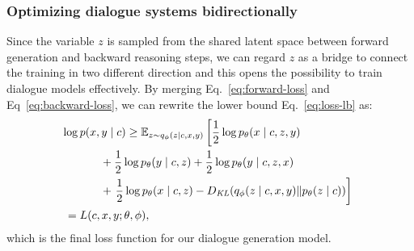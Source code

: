 \documentclass[sigconf]{acmart}
\begin{document}
\subsubsection{Optimizing dialogue systems bidirectionally} Since the variable $z$ is sampled from the shared latent space between forward generation and backward reasoning steps, we can regard $z$ as a bridge to connect the training in two different direction and this opens the possibility to train dialogue models effectively. By merging Eq.~\ref{eq:forward-loss} and Eq~\ref{eq:backward-loss}, we can rewrite the lower bound Eq.~\ref{eq:loss-lb} as:
%
\begin{equation}
\begin{split}
\mbox{}\hspace*{-2mm}
\log {} &p(x,y \mid c) \geq \mathbb{E}_{z \sim q_\phi(z \mid c, x, y)} \left[
 \frac{1}{2} \log p_\theta (x \mid c, z, y)  \right. \\
& \phantom{XX}+ \frac{1}{2} \log p_\theta (y \mid c, z)  + \frac{1}{2}\log p_\theta (y \mid c, z, x) \\
& \phantom{XX}+ \left.\frac{1}{2} \log p_\theta (x \mid c, z) -D_\mathit{KL}(q_\phi(z \mid c, x, y) \| p_\theta(z \mid c))\vphantom{\frac{1}{2}}\right]\\
 ={}&L(c, x, y; \theta, \phi),
\end{split}
\label{eq:loss}
\end{equation}
%
which is the final loss function for our dialogue generation model. 
\end{document}
